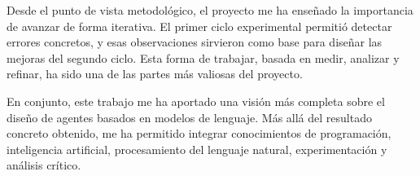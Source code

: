 \documentclass[12pt,a4paper,twoside,openright]{book}
\begin{document}
Desde el punto de vista metodológico, el proyecto me ha enseñado la importancia de avanzar de forma iterativa. El primer ciclo experimental permitió detectar errores concretos, y esas observaciones sirvieron como base para
diseñar las mejoras del segundo ciclo. Esta forma de trabajar, basada en medir, analizar y refinar, ha sido una de las partes más valiosas del proyecto.

En conjunto, este trabajo me ha aportado una visión más completa sobre el diseño de agentes basados en modelos de lenguaje. Más allá del resultado concreto obtenido, me ha permitido integrar conocimientos de programación,
inteligencia artificial, procesamiento del lenguaje natural, experimentación y análisis crítico.





\backmatter
\printbibliography[title={Bibliografía}]
\cleardoublepage
\MakeUMABackCover
\end{document}
